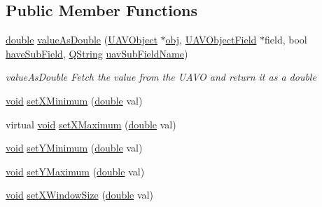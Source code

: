 \subsection*{Public Member Functions}
\begin{DoxyCompactItemize}
\item 
\hyperlink{_super_l_u_support_8h_a8956b2b9f49bf918deed98379d159ca7}{double} \hyperlink{group___scope_plugin_ga7a54fec6758e8641d8baaefca4deddc9}{value\-As\-Double} (\hyperlink{class_u_a_v_object}{U\-A\-V\-Object} $\ast$\hyperlink{glext_8h_a0c0d4701a6c89f4f7f0640715d27ab26}{obj}, \hyperlink{class_u_a_v_object_field}{U\-A\-V\-Object\-Field} $\ast$field, bool \hyperlink{group___scope_plugin_ga75814d7f770a1a8348f39dc7ca4bdb8f}{have\-Sub\-Field}, \hyperlink{group___u_a_v_objects_plugin_gab9d252f49c333c94a72f97ce3105a32d}{Q\-String} \hyperlink{group___scope_plugin_ga22ac4a688fa35def44e941b82b0a0b60}{uav\-Sub\-Field\-Name})
\begin{DoxyCompactList}\small\item\em value\-As\-Double Fetch the value from the U\-A\-V\-O and return it as a double \end{DoxyCompactList}\item 
\hyperlink{group___u_a_v_objects_plugin_ga444cf2ff3f0ecbe028adce838d373f5c}{void} \hyperlink{group___scope_plugin_ga8352ce6b7eb9118afa04e021fbba40cc}{set\-X\-Minimum} (\hyperlink{_super_l_u_support_8h_a8956b2b9f49bf918deed98379d159ca7}{double} val)
\item 
virtual \hyperlink{group___u_a_v_objects_plugin_ga444cf2ff3f0ecbe028adce838d373f5c}{void} \hyperlink{group___scope_plugin_ga3f195254ad44f888d45d763d819d4341}{set\-X\-Maximum} (\hyperlink{_super_l_u_support_8h_a8956b2b9f49bf918deed98379d159ca7}{double} val)
\item 
\hyperlink{group___u_a_v_objects_plugin_ga444cf2ff3f0ecbe028adce838d373f5c}{void} \hyperlink{group___scope_plugin_ga74a63f7995ced2fd9c0fffbde542e75b}{set\-Y\-Minimum} (\hyperlink{_super_l_u_support_8h_a8956b2b9f49bf918deed98379d159ca7}{double} val)
\item 
\hyperlink{group___u_a_v_objects_plugin_ga444cf2ff3f0ecbe028adce838d373f5c}{void} \hyperlink{group___scope_plugin_ga7dcfb9885435134bdde7c5006213afd8}{set\-Y\-Maximum} (\hyperlink{_super_l_u_support_8h_a8956b2b9f49bf918deed98379d159ca7}{double} val)
\item 
\hyperlink{group___u_a_v_objects_plugin_ga444cf2ff3f0ecbe028adce838d373f5c}{void} \hyperlink{group___scope_plugin_ga35f3eec02d08ef7ab235fe297178c265}{set\-X\-Window\-Size} (\hyperlink{_super_l_u_support_8h_a8956b2b9f49bf918deed98379d159ca7}{double} val)

\end{DoxyCompactItemize}
